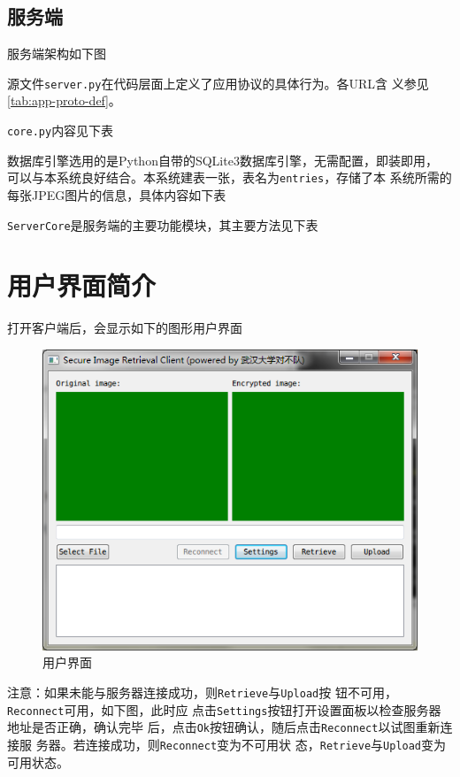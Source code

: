 \subsection{服务端}
服务端架构如下图


源文件\texttt{server.py}在代码层面上定义了应用协议的具体行为。各URL含
义参见\ref{tab:app-proto-def}。

\texttt{core.py}内容见下表


数据库引擎选用的是Python自带的SQLite3数据库引擎，无需配置，即装即用，
可以与本系统良好结合。本系统建表一张，表名为\texttt{entries}，存储了本
系统所需的每张JPEG图片的信息，具体内容如下表


\texttt{ServerCore}是服务端的主要功能模块，其主要方法见下表


\section{用户界面简介}
\label{sec:ui-intro}

打开客户端后，会显示如下的图形用户界面
\begin{figure}[H]\centering
  \includegraphics[keepaspectratio=true]{images/ui-connected.png}
  \caption{用户界面}
\label{fig:ui-connected}
\end{figure}

注意：如果未能与服务器连接成功，则\texttt{Retrieve}与\texttt{Upload}按
钮不可用，\texttt{Reconnect}可用，如下图，此时应
点击\texttt{Settings}按钮打开设置面板以检查服务器地址是否正确，确认完毕
后，点击\texttt{Ok}按钮确认，随后点击\texttt{Reconnect}以试图重新连接服
务器。若连接成功，则\texttt{Reconnect}变为不可用状
态，\texttt{Retrieve}与\texttt{Upload}变为可用状态。

